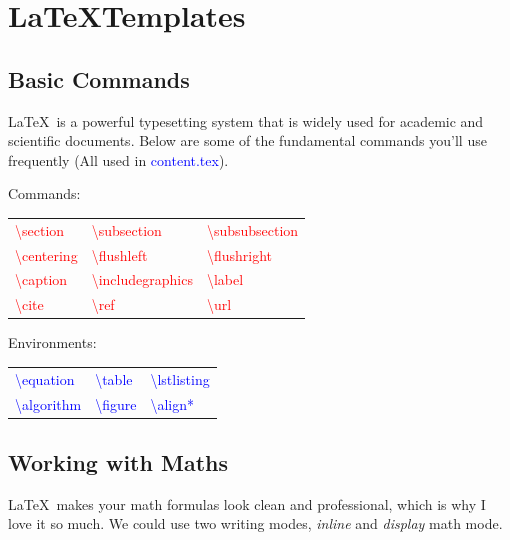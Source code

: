\newpage




\section*{\LaTeX Templates} 
\subsection*{Basic Commands}
\LaTeX\ is a powerful typesetting system that is widely used for academic and scientific documents. Below are some of the fundamental commands you'll use frequently (All used in \textcolor{blue}{content.tex}).

Commands: 
\begin{table}[h]
    \centering
    \begin{tabular}{lll}
        \textcolor{red}{\textbackslash section}         & \textcolor{red}{\textbackslash subsection}      & \textcolor{red}{\textbackslash subsubsection}   \\
        \textcolor{red}{\textbackslash centering}       & \textcolor{red}{\textbackslash flushleft}       & \textcolor{red}{\textbackslash flushright}      \\
        \textcolor{red}{\textbackslash caption}         & \textcolor{red}{\textbackslash includegraphics} & \textcolor{red}{\textbackslash label}           \\
        \textcolor{red}{\textbackslash cite}            & \textcolor{red}{\textbackslash ref}             & \textcolor{red}{\textbackslash url}             \\
    \end{tabular}
\end{table}

Environments:
\begin{table}[h]
    \centering
    \begin{tabular}{lll}
        \textcolor{blue}{\textbackslash equation}    & \textcolor{blue}{\textbackslash table}       & \textcolor{blue}{\textbackslash lstlisting}  \\
        \textcolor{blue}{\textbackslash algorithm}   & \textcolor{blue}{\textbackslash figure}      & \textcolor{blue}{\textbackslash align*}      \\
    \end{tabular}
\end{table}

\subsection*{Working with Maths}
\LaTeX\ makes your math formulas look clean and professional, which is why I love it so much. We could use two writing modes, \textit{inline} and \textit{display} math mode.

